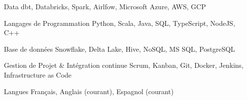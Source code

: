 \begin{cvskills}

	\cvskill
	{Data}
	{dbt, Databricks, Spark, Airlfow, Microsoft Azure, AWS, GCP}

	\cvskill
	{Langages de Programmation}
	{Python, Scala, Java, SQL, TypeScript, NodeJS, C++}
	
	\cvskill
	{Base de données}
	{Snowflake, Delta Lake, Hive, NoSQL, MS SQL, PostgreSQL}
	
	\cvskill
	{Gestion de Projet \& Intégration continue}
	{Scrum, Kanban, Git, Docker, Jenkins, Infrastructure as Code}
	
	\cvskill
	{Langues}
	{Français, Anglais (courant), Espagnol (courant)}
	
\end{cvskills}